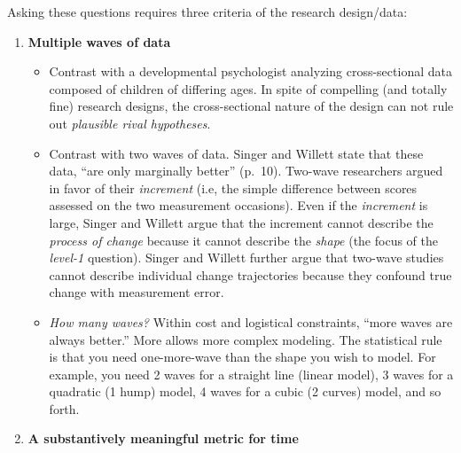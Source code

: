 \documentclass[
  11pt,
]{book}
\providecommand{\tightlist}{%
  \setlength{\itemsep}{0pt}\setlength{\parskip}{0pt}}
\begin{document}
Asking these questions requires three criteria of the research design/data:

\begin{enumerate}
\def\labelenumi{\arabic{enumi}.}
\tightlist
\item
  \textbf{Multiple waves of data}

  \begin{itemize}
  \tightlist
  \item
    Contrast with a developmental psychologist analyzing cross-sectional data composed of children of differing ages. In spite of compelling (and totally fine) research designs, the cross-sectional nature of the design can not rule out \emph{plausible rival hypotheses}.
  \item
    Contrast with two waves of data. Singer and Willett \citeyearpar{singer_applied_2003} state that these data, ``are only marginally better'' (p.~10). Two-wave researchers argued in favor of their \emph{increment} (i.e, the simple difference between scores assessed on the two measurement occasions). Even if the \emph{increment} is large, Singer and Willett \citeyearpar{singer_applied_2003} argue that the increment cannot describe the \emph{process of change} because it cannot describe the \emph{shape} (the focus of the \emph{level-1} question). Singer and Willett further argue that two-wave studies cannot describe individual change trajectories because they confound true change with measurement error.
  \item
    \emph{How many waves?} Within cost and logistical constraints, ``more waves are always better.'' More allows more complex modeling. The statistical rule is that you need one-more-wave than the shape you wish to model. For example, you need 2 waves for a straight line (linear model), 3 waves for a quadratic (1 hump) model, 4 waves for a cubic (2 curves) model, and so forth.
  \end{itemize}
\item
  \textbf{A substantively meaningful metric for time}


\end{enumerate}
\end{document}
